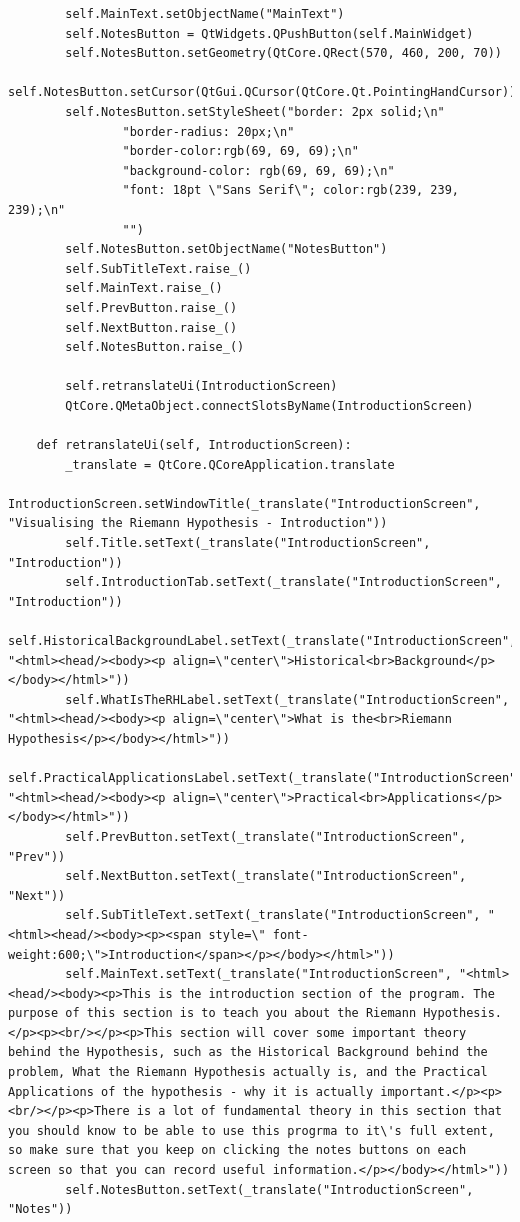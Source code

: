\documentclass{article}
\begin{document}
\begin{lstlisting}
        self.MainText.setObjectName("MainText")
        self.NotesButton = QtWidgets.QPushButton(self.MainWidget)
        self.NotesButton.setGeometry(QtCore.QRect(570, 460, 200, 70))
        self.NotesButton.setCursor(QtGui.QCursor(QtCore.Qt.PointingHandCursor))
        self.NotesButton.setStyleSheet("border: 2px solid;\n"
                "border-radius: 20px;\n"
                "border-color:rgb(69, 69, 69);\n"
                "background-color: rgb(69, 69, 69);\n"
                "font: 18pt \"Sans Serif\"; color:rgb(239, 239, 239);\n"
                "")
        self.NotesButton.setObjectName("NotesButton")
        self.SubTitleText.raise_()
        self.MainText.raise_()
        self.PrevButton.raise_()
        self.NextButton.raise_()
        self.NotesButton.raise_()

        self.retranslateUi(IntroductionScreen)
        QtCore.QMetaObject.connectSlotsByName(IntroductionScreen)

    def retranslateUi(self, IntroductionScreen):
        _translate = QtCore.QCoreApplication.translate
        IntroductionScreen.setWindowTitle(_translate("IntroductionScreen", "Visualising the Riemann Hypothesis - Introduction"))
        self.Title.setText(_translate("IntroductionScreen", "Introduction"))
        self.IntroductionTab.setText(_translate("IntroductionScreen", "Introduction"))
        self.HistoricalBackgroundLabel.setText(_translate("IntroductionScreen", "<html><head/><body><p align=\"center\">Historical<br>Background</p></body></html>"))
        self.WhatIsTheRHLabel.setText(_translate("IntroductionScreen", "<html><head/><body><p align=\"center\">What is the<br>Riemann Hypothesis</p></body></html>"))
        self.PracticalApplicationsLabel.setText(_translate("IntroductionScreen", "<html><head/><body><p align=\"center\">Practical<br>Applications</p></body></html>"))
        self.PrevButton.setText(_translate("IntroductionScreen", "Prev"))
        self.NextButton.setText(_translate("IntroductionScreen", "Next"))
        self.SubTitleText.setText(_translate("IntroductionScreen", "<html><head/><body><p><span style=\" font-weight:600;\">Introduction</span></p></body></html>"))
        self.MainText.setText(_translate("IntroductionScreen", "<html><head/><body><p>This is the introduction section of the program. The purpose of this section is to teach you about the Riemann Hypothesis.</p><p><br/></p><p>This section will cover some important theory behind the Hypothesis, such as the Historical Background behind the problem, What the Riemann Hypothesis actually is, and the Practical Applications of the hypothesis - why it is actually important.</p><p><br/></p><p>There is a lot of fundamental theory in this section that you should know to be able to use this progrma to it\'s full extent, so make sure that you keep on clicking the notes buttons on each screen so that you can record useful information.</p></body></html>"))
        self.NotesButton.setText(_translate("IntroductionScreen", "Notes"))
\end{lstlisting}
\end{document}
